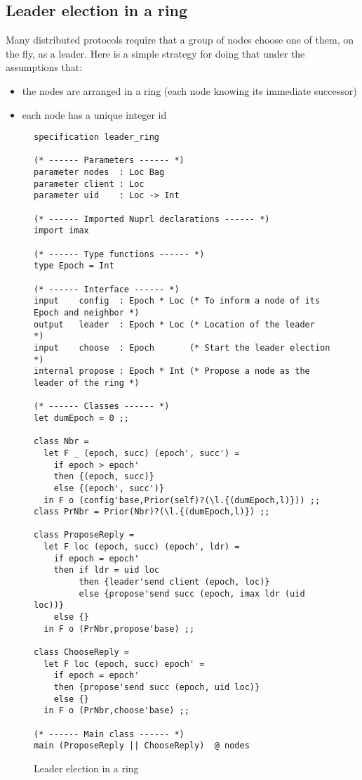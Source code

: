 \documentclass[final]{article}
\begin{document}
\subsection{Leader election in a ring}
\label{sec:leader-ring}


Many distributed protocols require that a group of nodes choose one of
them, on the fly, as a leader.  Here is a simple strategy for doing
that under the assumptions that:
\begin{itemize}
\item the nodes are arranged in a ring (each node knowing its
  immediate successor)
\item each node has a unique integer id
\end{itemize}

\begin{figure}[!t]
  \begin{lstlisting}[basicstyle=\small]
specification leader_ring

(* ------ Parameters ------ *)
parameter nodes  : Loc Bag
parameter client : Loc
parameter uid    : Loc -> Int

(* ------ Imported Nuprl declarations ------ *)
import imax

(* ------ Type functions ------ *)
type Epoch = Int

(* ------ Interface ------ *)
input    config  : Epoch * Loc (* To inform a node of its Epoch and neighbor *)
output   leader  : Epoch * Loc (* Location of the leader    *)
input    choose  : Epoch       (* Start the leader election *)
internal propose : Epoch * Int (* Propose a node as the leader of the ring *)

(* ------ Classes ------ *)
let dumEpoch = 0 ;;

class Nbr =
  let F _ (epoch, succ) (epoch', succ') =
    if epoch > epoch'
    then {(epoch, succ)}
    else {(epoch', succ')}
  in F o (config'base,Prior(self)?(\l.{(dumEpoch,l)})) ;;
class PrNbr = Prior(Nbr)?(\l.{(dumEpoch,l)}) ;;

class ProposeReply =
  let F loc (epoch, succ) (epoch', ldr) =
    if epoch = epoch'
    then if ldr = uid loc
         then {leader'send client (epoch, loc)}
         else {propose'send succ (epoch, imax ldr (uid loc))}
    else {}
  in F o (PrNbr,propose'base) ;;

class ChooseReply =
  let F loc (epoch, succ) epoch' =
    if epoch = epoch'
    then {propose'send succ (epoch, uid loc)}
    else {}
  in F o (PrNbr,choose'base) ;;

(* ------ Main class ------ *)
main (ProposeReply || ChooseReply)  @ nodes
  \end{lstlisting}
  \caption{Leader election in a ring}
  \label{fig:leader-ring}
\end{figure}
\end{document}
